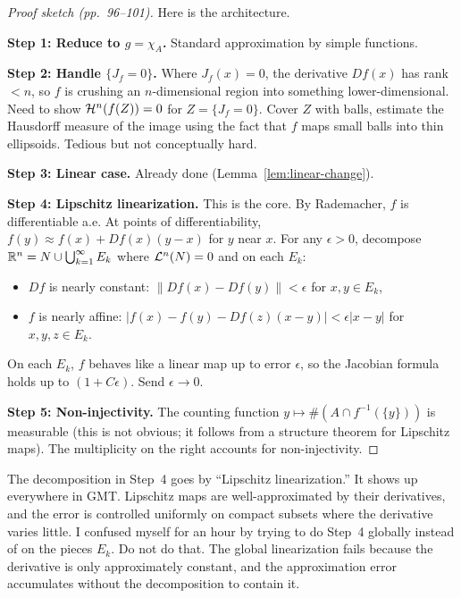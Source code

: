 \begin{proof}[Proof sketch (pp.~96--101)]
Here is the architecture.

\medskip
\noindent\textbf{Step 1: Reduce to $g = \chi_A$.}
Standard approximation by simple functions.

\medskip
\noindent\textbf{Step 2: Handle $\{J_f = 0\}$.}
Where $J_f(x) = 0$, the derivative $Df(x)$ has rank $< n$, so $f$ is crushing an $n$-dimensional region into something lower-dimensional. Need to show $\mathcal{H}^n(f(Z)) = 0$ for $Z = \{J_f = 0\}$. Cover $Z$ with balls, estimate the Hausdorff measure of the image using the fact that $f$ maps small balls into thin ellipsoids. Tedious but not conceptually hard.

\medskip
\noindent\textbf{Step 3: Linear case.}
Already done (Lemma~\ref{lem:linear-change}).

\medskip
\noindent\textbf{Step 4: Lipschitz linearization.}
This is the core. By Rademacher, $f$ is differentiable a.e. At points of differentiability, $f(y) \approx f(x) + Df(x)(y - x)$ for $y$ near $x$. For any $\epsilon > 0$, decompose $\mathbb{R}^n = N \cup \bigcup_{k=1}^\infty E_k$ where $\mathcal{L}^n(N) = 0$ and on each $E_k$:
\begin{itemize}
  \item $Df$ is nearly constant: $\|Df(x) - Df(y)\| < \epsilon$ for $x, y \in E_k$,
  \item $f$ is nearly affine: $|f(x) - f(y) - Df(z)(x-y)| < \epsilon|x-y|$ for $x, y, z \in E_k$.
\end{itemize}
On each $E_k$, $f$ behaves like a linear map up to error $\epsilon$, so the Jacobian formula holds up to $(1 + C\epsilon)$. Send $\epsilon \to 0$.

\medskip
\noindent\textbf{Step 5: Non-injectivity.}
The counting function $y \mapsto \#(A \cap f^{-1}(\{y\}))$ is measurable (this is not obvious; it follows from a structure theorem for Lipschitz maps). The multiplicity on the right accounts for non-injectivity.
\end{proof}

The decomposition in Step~4 goes by ``Lipschitz linearization.'' It shows up everywhere in GMT. Lipschitz maps are well-approximated by their derivatives, and the error is controlled uniformly on compact subsets where the derivative varies little. I confused myself for an hour by trying to do Step~4 globally instead of on the pieces $E_k$. Do not do that. The global linearization fails because the derivative is only approximately constant, and the approximation error accumulates without the decomposition to contain it.


